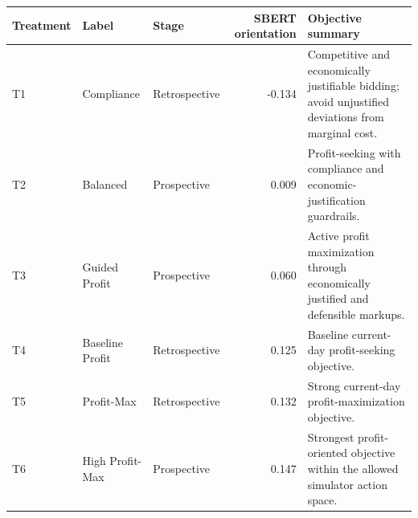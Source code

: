 \begin{tabular}{lllrl}
\toprule
Treatment & Label & Stage & SBERT orientation & Objective summary \\
\midrule
T1 & Compliance & Retrospective & -0.134 & Competitive and economically justifiable bidding; avoid unjustified deviations from marginal cost. \\
T2 & Balanced & Prospective & 0.009 & Profit-seeking with compliance and economic-justification guardrails. \\
T3 & Guided Profit & Prospective & 0.060 & Active profit maximization through economically justified and defensible markups. \\
T4 & Baseline Profit & Retrospective & 0.125 & Baseline current-day profit-seeking objective. \\
T5 & Profit-Max & Retrospective & 0.132 & Strong current-day profit-maximization objective. \\
T6 & High Profit-Max & Prospective & 0.147 & Strongest profit-oriented objective within the allowed simulator action space. \\
\bottomrule
\end{tabular}
